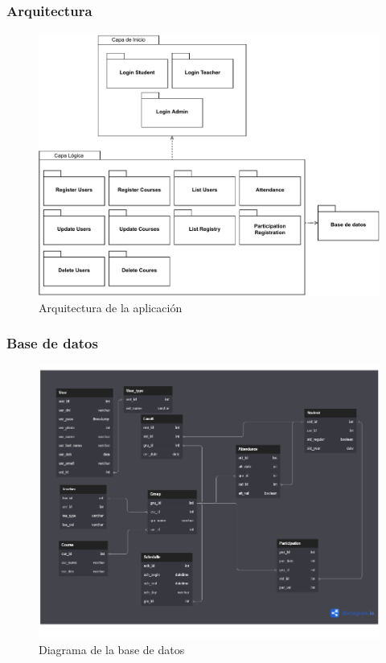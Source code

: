\documentclass{article}
\begin{document}
\subsubsection{Arquitectura}
\pagebreak %
\begin{figure}[h]
    \centering
    \includegraphics[width=1\textwidth]{assets/arq3.pdf}
    \caption{Arquitectura de la aplicación}
    \label{fig:arquitectura}
\end{figure}

\subsubsection{Base de datos}
\begin{figure}[H]
    \centering
    \includegraphics{assets/db.pdf}
    \caption{Diagrama de la base de datos}
    \label{fig:db}
\end{figure}
\end{document}
